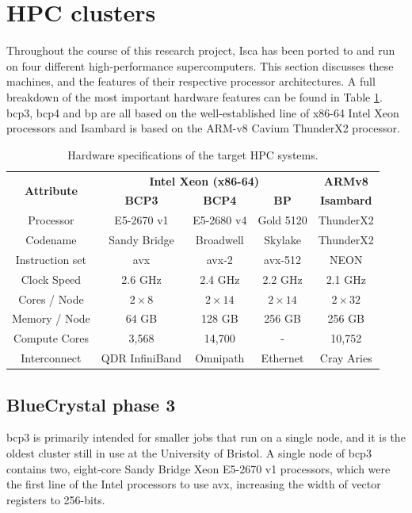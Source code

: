 \documentclass[a4paper,11pt]{report}
\begin{document}
\section{HPC clusters}
Throughout the course of this research project, Isca has been ported to and run on four different high-performance supercomputers. This section discusses these machines, and the features of their respective processor architectures. A full breakdown of the most important hardware features can be found in Table \ref{tbl:hardware}. \gls{bcp3}, \gls{bcp4} and \gls{bp} are all based on the well-established line of x86-64 Intel Xeon processors and Isambard is based on the ARM-v8 Cavium ThunderX2 processor.
\begin{table}[!ht]
\centering
\caption[Hardware specifications of the target HPC systems]{Hardware specifications of the target HPC systems. }
\begin{tabular}{@{\extracolsep{4pt}}ccccc}
\toprule 
\multirow{2}{*}{\textbf{Attribute}} & \multicolumn{3}{c}{\textbf{Intel Xeon (x86-64)}} & \multicolumn{1}{c}{\textbf{ARMv8}}\\

				\cmidrule(lr){2-4} \cmidrule(lr){5-5}

 				& {\textbf{BCP3}} 	& {\textbf{BCP4}} 		& {\textbf{BP}} 		& {\textbf{Isambard}} \\
\midrule
Processor	   		& E5-2670 v1 		& E5-2680 v4			& Gold 5120			& ThunderX2	\\
Codename            	& Sandy Bridge	        & Broadwell         		& Skylake       		   	& ThunderX2   	\\
Instruction set		& \gls{avx}		& \gls{avx}-2			& \gls{avx}-512			& NEON		\\
Clock Speed	   	& 2.6 GHz		    	& 2.4 GHz				& 2.2 GHz				&  2.1 GHz 	\\
Cores / Node		& $2\times8$		& $2\times14$			& $2 \times 14$			& $2\times32$	\\
Memory / Node		& 64 GB			& 128 GB				& 256 GB					& 256 GB		\\
Compute Cores		& 3,568		    	&14,700				& -					& 10,752 		\\
Interconnect		&  QDR InfiniBand	& Omnipath			& Ethernet			& Cray Aries	\\
\bottomrule
\end{tabular}
\label{tbl:hardware}
\end{table}

\subsection{BlueCrystal phase 3}
\gls{bcp3} is primarily intended for smaller jobs that run on a single node, and it is the oldest cluster still in use at the University of Bristol. A single node of \gls{bcp3} contains two, eight-core Sandy Bridge Xeon E5-2670 v1 processors, which were the first line of the Intel processors to use \gls{avx}, increasing the width of vector registers to 256-bits. 
\end{document}

